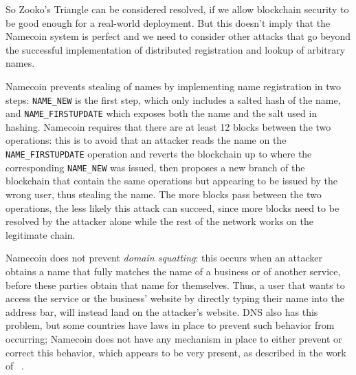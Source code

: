 \documentclass[mscthesis]{usiinfthesis}
\begin{document}
So Zooko's Triangle can be considered resolved, if we allow blockchain security to be good enough for a real-world deployment. But this doesn't imply that the Namecoin system is perfect and we need to consider other attacks that go beyond the successful implementation of distributed registration and lookup of arbitrary names.

Namecoin prevents stealing of names by implementing name registration in two steps: \texttt{NAME\_NEW} is the first step, which only includes a salted hash of the name, and \texttt{NAME\_FIRSTUPDATE} which exposes both the name and the salt used in hashing. Namecoin requires that there are at least 12 blocks between the two operations: this is to avoid that an attacker reads the name on the \texttt{NAME\_FIRSTUPDATE} operation and reverts the blockchain up to where the corresponding \texttt{NAME\_NEW} was issued, then proposes a new branch of the blockchain that contain the same operations but appearing to be issued by the wrong user, thus stealing the name. The more blocks pass between the two operations, the less likely this attack can succeed, since more blocks need to be resolved by the attacker alone while the rest of the network works on the legitimate chain.

Namecoin does not prevent \emph{domain squatting}: this occurs when an attacker obtains a name that fully matches the name of a business or of another service, before these parties obtain that name for themselves. Thus, a user that wants to access the service or the business' website by directly typing their name into the address bar, will instead land on the attacker's website. DNS also has this problem, but some countries have laws in place to prevent such behavior from occurring; Namecoin does not have any mechanism in place to either prevent or correct this behavior, which appears to be very present, as described in the work of ~\cite{kalodner2015empirical}.
\end{document}
